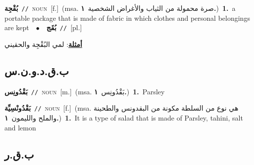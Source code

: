 \documentclass[10pt,a4paper,twoside]{article} %
\begin{document}
\begin{multicols}{2}
{\setlength\topsep{0pt}\textbf{\foreignlanguage{arabic}{بُقْجِة}}\ {\color{gray}\texttt{//}\color{black}}\ \textsc{noun}\ [f.]\ \color{gray}(msa. \foreignlanguage{arabic}{صرة محمولة من الثياب والأغراض الشخصية}~\foreignlanguage{arabic}{\textbf{١.}})\color{black}\ \textbf{1.}~a portable package that is made of fabric in which clothes and personal belongings are kept\ \ $\bullet$\ \ \setlength\topsep{0pt}\textbf{\foreignlanguage{arabic}{بُقَج}}\ {\color{gray}\texttt{//}\color{black}}\ [pl.]\  \begin{flushright}\color{gray}\foreignlanguage{arabic}{\textbf{\underline{\foreignlanguage{arabic}{أمثلة}}}: لمي البُقْجِة والحقيني}\end{flushright}\color{black}} \vspace{2mm}

\vspace{-3mm}
\subsection*{\color{blue}\foreignlanguage{arabic}{ب.ق.د.و.ن.س}\color{blue}{ (ntws)}} 

{\setlength\topsep{0pt}\textbf{\foreignlanguage{arabic}{بَقْدُونِس}}\ {\color{gray}\texttt{//}\color{black}}\ \textsc{noun}\ [m.]\ \color{gray}(msa. \foreignlanguage{arabic}{بَقْدُونِس}~\foreignlanguage{arabic}{\textbf{١.}})\color{black}\ \textbf{1.}~Parsley\ } \vspace{2mm}

{\setlength\topsep{0pt}\textbf{\foreignlanguage{arabic}{بَقْدُونْسِيِّة}}\ {\color{gray}\texttt{//}\color{black}}\ \textsc{noun}\ [f.]\ \color{gray}(msa. \foreignlanguage{arabic}{هي نوع من السلطة مكونة من البقدونس والطحينة والملح والليمون}~\foreignlanguage{arabic}{\textbf{١.}})\color{black}\ \textbf{1.}~It is a type of salad that is made of Parsley, tahini, salt and lemon\ } \vspace{2mm}

\vspace{-3mm}
\subsection*{\color{blue}\foreignlanguage{arabic}{ب.ق.ر}\color{blue}{}} 


\end{multicols}
\end{document}
